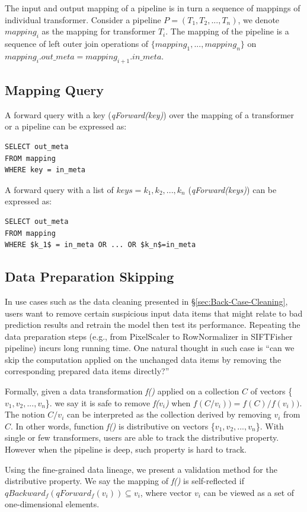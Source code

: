 \documentclass{sig-alternate}
\begin{document}
The input and output mapping of a pipeline is in turn a sequence of mappings of individual transformer.
Consider a pipeline $P=(T_1, T_2, ..., T_n)$, we denote $mapping_i$ as the mapping for transformer $T_i$.
The mapping of the pipeline is a sequence of left outer join operations of $\{mapping_1, ..., mapping_n\}$ on 
$mapping_i.out\_meta = mapping_{i+1}.in\_meta$.

\subsection{Mapping Query}
A forward query with a key  ({\it qForward(key)}) over the mapping of a transformer or a pipeline can be expressed as:
\begin{lstlisting}
SELECT out_meta
FROM mapping
WHERE key = in_meta
\end{lstlisting}

A forward query with a list of $keys={k_1, k_2, ..., k_n}$ ({\it qForward(keys)}) can be expressed as:
\begin{lstlisting}
SELECT out_meta
FROM mapping
WHERE $k_1$ = in_meta OR ... OR $k_n$=in_meta
\end{lstlisting}

\subsection{Data Preparation Skipping}
In use cases such as the data cleaning presented in \S\ref{sec:Back-Case-Cleaning}, users want
to remove certain suspicious input data items that might relate to bad prediction results and retrain the model then
test its performance. 
Repeating the data preparation steps (e.g., from PixelScaler to RowNormalizer in SIFTFisher pipeline) incurs
long running time.
One natural thought in such case is ``can we skip the computation applied on the unchanged data items by removing
the corresponding prepared data items directly?''

Formally, given a data transformation {\it f()} applied on a collection $C$ of vectors \{$v_1, v_2, ..., v_n$\}.
we say it is safe to remove {\it f($v_i$)} when {\it $f(C/v_i)) = f(C)/f(v_i))$}.
The notion {\it $C/v_i$} can be interpreted as the collection derived by removing $v_i$ from $C$.
In other words, function {\it f()} is distributive on vectors \{$v_1, v_2, ..., v_n$\}. 
With single or few transformers, users are able to track the distributive property.
However when the pipeline is deep, such property is hard to track.

Using the fine-grained data lineage, we present a validation method for the distributive property.
We say the mapping of {\it f()} is self-reflected if $qBackward_f(qForward_f(v_i)) \subseteq v_i$, where vector $v_i$ can be viewed 
as a set of one-dimensional elements.
\end{document}
